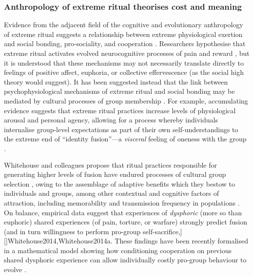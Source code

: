 \subsubsection{
  Anthropology of extreme ritual theorises cost and meaning
  \label{sect:extremeRitual}
              }
Evidence from the adjacent field of the cognitive and evolutionary anthropology of extreme ritual suggests a relationship between extreme physiological exertion and social bonding, pro-sociality, and cooperation \citep{Whitehouse2004,Xygalatas2013,Fischer2014a}. Researchers hypothesise that extreme ritual activates evolved neurocognitive processes of pain and reward \citep{Bastian2014,vanBunderen2014}, but it is understood that these mechanisms may not necessarily translate directly to feelings of positive affect, euphoria, or collective  effervescence (as the social high theory would suggest).  It has been suggested instead that the link between psychophysiological mechanisms of extreme ritual and social bonding may be mediated by cultural processes of group membership \citep{Whitehouse2004,Whitehouse2014a}.  For example, accumulating evidence suggests that extreme ritual practices increase levels of physiological arousal and personal agency, allowing for a process whereby individuals internalise group-level expectations as part of their own self-understandings to the extreme end of ``identity fusion''---a \textit{visceral} feeling of oneness with the group  \citep[hereafter simply ``fusion''][]{Swann2010,Swann2015}.

Whitehouse and colleagues propose that ritual practices responsible for generating higher levels of fusion have endured processes of cultural group selection \citep[or technically ``cultural attraction,'' cf.][]{Claidiere2007}, owing to the assemblage of adaptive benefits which they bestow to individuals and groups, among other contextual and cognitive factors of attraction, including memorability and transmission frequency in populations \citep{Atkinson2011}.  On balance, empirical data suggest that experiences of \textit{dysphoric} (more so than euphoric) shared experiences (of pain, torture, or warfare) strongly predict fusion (and in turn willingness to perform pro-group self-sacrifice,][]{Whitehouse2014,Whitehouse2014a}. These findings have been recently formalised in a mathematical model showing how conditioning cooperation on previous shared dysphoric experience can allow individually costly pro-group behaviour to evolve  \citep{Whitehouse2017}.

